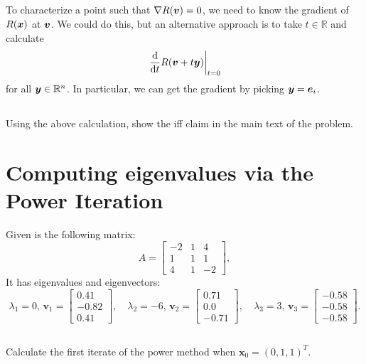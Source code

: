\documentclass[11pt,letterpaper]{report}
\begin{document}
\subsection{}
To characterize a point such that $\nabla R(\boldsymbol{v}) = 0$, we need to know the gradient of $R(\boldsymbol{x})$ at $\boldsymbol{v}$. We could do this, but an alternative approach is to take $t\in \mathbb{R}$ and calculate
\begin{align*}
    \left.\frac{\mathrm{d}}{\mathrm{d} t} R(\boldsymbol{v}+t\boldsymbol{y})\right|_{t=0}
\end{align*}
for all $\boldsymbol{y}\in\mathbb{R}^n$. In particular, we can get the gradient by picking $\boldsymbol{y} = \boldsymbol{e}_i$.

\subsection{}
Using the above calculation, show the iff claim in the main text of the problem.

\section{Computing eigenvalues via the Power Iteration}
Given is the following matrix:
\[
A=\begin{bmatrix}
-2 & 1 & 4  \\ 1 & 1 & 1 \\ 4 & 1 & -2 \end{bmatrix},
\]
It has eigenvalues and eigenvectors:
\[
\lambda_1=0,
\, {\boldsymbol v_1}
=\begin{bmatrix}
0.41  \\ -0.82 \\ 0.41 \end{bmatrix},\quad
\lambda_2=-6,
\,{\boldsymbol v_2}
=\begin{bmatrix}
0.71  \\ 0.0 \\ -0.71 \end{bmatrix},\quad
\lambda_3=3, \,{\boldsymbol v_3}
=\begin{bmatrix}
-0.58  \\ -0.58 \\ -0.58 \end{bmatrix}.
\]

\subsection{}\label{sec:1.a}
Calculate the first iterate of the power method when ${\boldsymbol x_0}=(0,1,1)^T$.
\end{document}
